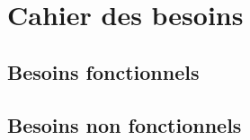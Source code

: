\chapter{Cahier des besoins}

\section{Besoins fonctionnels}


\section{Besoins non fonctionnels}



